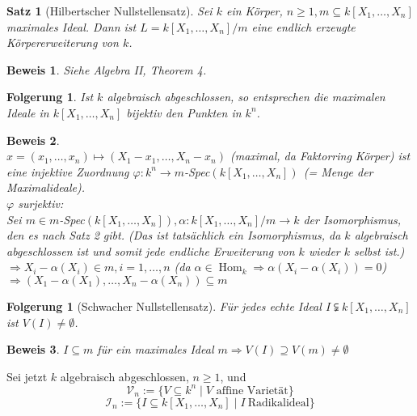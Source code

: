 \documentclass[a4paper,12pt]{report}
\theoremstyle{break}
\newtheorem{Satz}{Satz}
\newtheorem{Folg}[Def]{Folgerung}
\theoremstyle{nonumberbreak}
\theoremstyle{nonumberplain}
\newtheorem{Bew}{Beweis}
\begin{document}
\begin{Satz}[Hilbertscher Nullstellensatz]
\label{satz:HNSaffin}
Sei  $k$ ein Körper, $n\geq 1, m\subseteq k[X_1,\dots,X_n]$ maximales Ideal. Dann ist $L=k[X_1,\dots,X_n]/m$ eine endlich erzeugte Körpererweiterung von $k$.
\end{Satz}
\begin{Bew} Siehe Algebra II, Theorem 4. \end{Bew}
\begin{Folg}
Ist $k$ algebraisch abgeschlossen, so entsprechen die maximalen Ideale in $k[X_1,\dots,X_n]$ bijektiv den Punkten in $k^n$.
\end{Folg}
\begin{Bew}~\\
$x=(x_1,\dots,x_n)\mapsto (X_1-x_1,\dots,X_n-x_n)$ (maximal, da Faktorring Körper) ist eine injektive Zuordnung $\varphi: k^n \rightarrow m$-Spec$(k[X_1,\dots,X_n])~~$(= Menge der Maximalideale).\\
$\varphi$ surjektiv:\\
Sei $m \in m$-Spec$(k[X_1,\dots,X_n]), \alpha: k[X_1,\dots,X_n]/m \rightarrow k$ der Isomorphismus, den es nach Satz 2 gibt. (Das ist tatsächlich ein Isomorphismus, da $k$ algebraisch abgeschlossen ist und somit jede endliche Erweiterung von $k$ wieder $k$ selbst ist.)\\
$\Rightarrow X_i - \alpha(X_i)\in m, i= 1,\dots,n$ (da $\alpha\in \operatorname{Hom}_k\Rightarrow \alpha(X_i-\alpha(X_i))=0$)\\
$\Rightarrow (X_1-\alpha(X_1),\dots,X_n-\alpha(X_n)) \subseteq m$
\end{Bew}
\begin{Folg}[Schwacher Nullstellensatz]
Für jedes echte Ideal $I\subsetneqq k[X_1,\dots,X_n]$ ist $V(I)\neq \emptyset$.
\end{Folg}
\begin{Bew}
$I\subseteq m$ für ein maximales Ideal $m \Rightarrow V(I) \supseteq V(m) \neq \emptyset$
\end{Bew}
Sei jetzt  $k$ algebraisch abgeschlossen, $n\geq 1$, und
$$\mathcal{V}_n:= \{V\subseteq k^n\mid V \textrm{~affine~Varietät}\}$$
$$\mathcal{I}_n:=\{I\subseteq k[X_1,\dots,X_n]\mid I ~ \textrm{Radikalideal}\}$$
\end{document}
